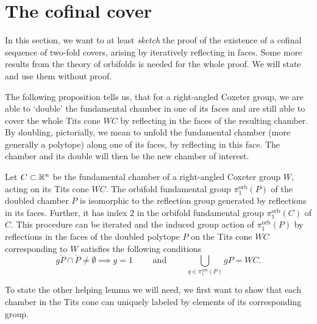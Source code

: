 \section{The cofinal cover}

In this section, we want to at least \emph{sketch} the proof of the existence of a cofinal sequence of two-fold covers, arising by iteratively reflecting in faces.
Some more results from the theory of orbifolds is needed for the whole proof.
We will state and use them without proof.

The following proposition tells us, that for a right-angled Coxeter group, we are able to `double' the fundamental chamber in one of its faces and are still able to cover the whole Tits cone \(WC\) by reflecting in the faces of the resulting chamber.
By doubling, pictorially, we mean to unfold the fundamental chamber (more generally a polytope) along one of its faces, by reflecting in this face.
The chamber and its double will then be the new chamber of interest.

\begin{proposition}\label{prop:double}
    Let \(C \subset \mathbb{R}^n\) be the fundamental chamber of a right-angled Coxeter group \(W\), acting on its Tits cone \(WC\).
    The orbifold fundamental group \(\pi_1^{\text{orb}}(P)\) of the doubled chamber \(P\) is isomorphic to the reflection group generated by reflections in its faces.
    Further, it has index \(2\) in the orbifold fundamental group \(\pi_1^{\text{orb}}(C)\) of \(C\). %
    This procedure can be iterated and the induced group action of \(\pi_1^{\text{orb}}(P)\) by reflections in the faces of the doubled polytope \(P\) on the Tits cone \(WC\) corresponding to \(W\) satisfies the following conditions
    \[g\mathring{P} \cap \mathring{P} \neq \emptyset \implies g = 1 \qquad \text{ and } \qquad \underset{g \in \pi_1^{\text{orb}}(P)}{\bigcup} gP = WC.\]
\end{proposition}

To state the other helping lemma we will need, we first want to show that each chamber in the Tits cone can uniquely labeled by elements of its corresponding group.

